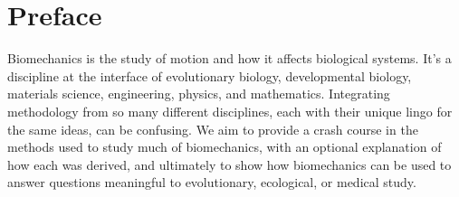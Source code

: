 \chapter*{Preface}

Biomechanics is the study of motion and how it affects biological systems. It's a discipline at the interface of evolutionary biology, developmental biology, materials science, engineering, physics, and mathematics. Integrating methodology from so many different disciplines, each with their unique lingo for the same ideas, can be confusing. We aim to provide a crash course in the methods used to study much of biomechanics, with an optional explanation of how each was derived, and ultimately to show how biomechanics can be used to answer questions meaningful to evolutionary, ecological, or medical study.


